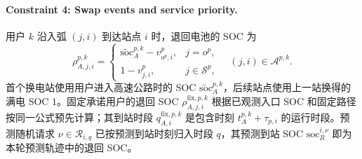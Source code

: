 \documentclass[12pt,a4paper,UTF8]{ctexart}
\begin{document}
\paragraph{Constraint 4: Swap events and service priority.}
用户 $k$ 沿入弧 $(j,i)$ 到达站点 $i$ 时，退回电池的 SOC 为
\begin{equation}
\rho_{A,j,i}^{p,k}
=
\begin{cases}
\widetilde{\mathrm{soc}}_{A}^{p,k}-v_{o^p,i}^{p},
&j=o^p,\\
1-v_{j,i}^{p},
&j\in\mathcal S^p,
\end{cases}
\quad (j,i)\in\mathcal A^{p,k}.
\label{eq:return_soc}
\end{equation}
首个换电站使用用户进入高速公路时的 SOC $\widetilde{\mathrm{soc}}_{A}^{p,k}$，后续站点使用上一站换得的满电 SOC $1$。固定承诺用户的退回 SOC
$\rho_{A,j,i}^{\mathrm{fix},p,k}$ 根据已观测入口 SOC 和固定路径按同一公式预先计算；其到站时段 $q_{A,i}^{\mathrm{fix},p,k}$ 是包含时刻 $t_A^{p,k}+\tau_{p,i}$ 的运行时段。预测随机请求
$\nu\in\mathcal R_{i,q}$ 已按预测到站时刻归入时段 $q$，其预测到站 SOC
$\mathrm{soc}_{R}^{i,\nu}$ 即为本轮预测轨迹中的退回 SOC。
\end{document}
